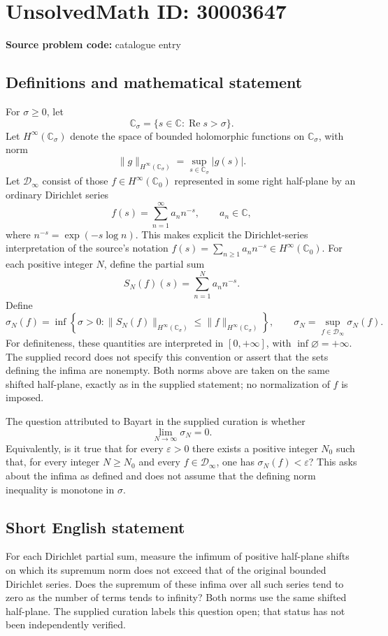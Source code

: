 \documentclass[11pt]{article}
\newcommand{\C}{\mathbb{C}}
\begin{document}
\section*{UnsolvedMath ID: 30003647}
\textbf{Source problem code:} catalogue entry
\subsection{Definitions and mathematical statement}
For \(\sigma\geq0\), let
\[
\mathbb C_\sigma=\{s\in\C:\operatorname{Re}s>\sigma\}.
\]
Let \(H^\infty(\mathbb C_\sigma)\) denote the space of bounded holomorphic functions on \(\mathbb C_\sigma\), with norm
\[
\|g\|_{H^\infty(\mathbb C_\sigma)}=\sup_{s\in\mathbb C_\sigma}|g(s)|.
\]
Let \(\mathcal D_\infty\) consist of those \(f\in H^\infty(\mathbb C_0)\) represented in some right half-plane by an ordinary Dirichlet series
\[
f(s)=\sum_{n=1}^{\infty}a_n n^{-s},\qquad a_n\in\C,
\]
where \(n^{-s}=\exp(-s\log n)\). This makes explicit the Dirichlet-series interpretation of the source's notation \(f(s)=\sum_{n\geq1}a_nn^{-s}\in H^\infty(\mathbb C_0)\).
For each positive integer \(N\), define the partial sum
\[
S_N(f)(s)=\sum_{n=1}^{N}a_n n^{-s}.
\]
Define
\[
\sigma_N(f)=\inf\left\{\sigma>0:
\|S_N(f)\|_{H^\infty(\mathbb C_\sigma)}
\leq\|f\|_{H^\infty(\mathbb C_\sigma)}\right\},
\qquad
\sigma_N=\sup_{f\in\mathcal D_\infty}\sigma_N(f).
\]
For definiteness, these quantities are interpreted in \([0,+\infty]\), with \(\inf\varnothing=+\infty\). The supplied record does not specify this convention or assert that the sets defining the infima are nonempty. Both norms above are taken on the same shifted half-plane, exactly as in the supplied statement; no normalization of \(f\) is imposed.

The question attributed to Bayart in the supplied curation is whether
\[
\lim_{N\to\infty}\sigma_N=0.
\]
Equivalently, is it true that for every \(\varepsilon>0\) there exists a positive integer \(N_0\) such that, for every integer \(N\geq N_0\) and every \(f\in\mathcal D_\infty\), one has \(\sigma_N(f)<\varepsilon\)? This asks about the infima as defined and does not assume that the defining norm inequality is monotone in \(\sigma\).
\subsection{Short English statement}
For each Dirichlet partial sum, measure the infimum of positive half-plane shifts on which its supremum norm does not exceed that of the original bounded Dirichlet series. Does the supremum of these infima over all such series tend to zero as the number of terms tends to infinity? Both norms use the same shifted half-plane. The supplied curation labels this question open; that status has not been independently verified.
\end{document}
